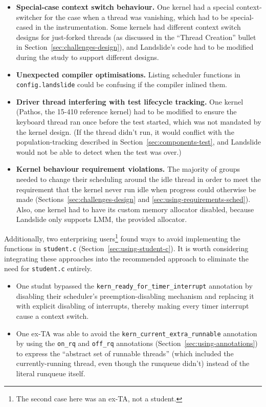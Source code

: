 \begin{itemize}
	\item {\bf Special-case context switch behaviour.} One kernel had a special context-switcher for the case when a thread was vanishing, which had to be special-cased in the instrumentation.
		Some kernels had different context switch designs for just-forked threads (as discussed in the ``Thread Creation'' bullet in Section~\ref{sec:challenges-design}), and Landslide's code had to be modified during the study to support different designs.
	\item {\bf Unexpected compiler optimisations.} Listing scheduler functions in \texttt{config.landslide} could be confusing if the compiler inlined them.
	\item {\bf Driver thread interfering with test lifecycle tracking.} One kernel (Pathos, the 15-410 reference kernel) had to be modified to ensure the keyboard thread ran once before the test started, which was not mandated by the kernel design. (If the thread didn't run, it would conflict with the population-tracking described in Section~\ref{sec:components-test}, and Landslide would not be able to detect when the test was over.)
	\item {\bf Kernel behaviour requirement violations.}
		The majority of groups needed to change their scheduling around the idle thread in order to meet the requirement that the kernel never run idle when progress could otherwise be made (Sections~\ref{sec:challenges-design} and \ref{sec:using-requirements-sched}).
		Also, one kernel had to have its custom memory allocator disabled, because Landslide only supports LMM, the provided allocator.
\end{itemize}

Additionally, two enterprising users\footnote{The second case here was an ex-TA, not a student.} found ways to avoid implementing the functions in \texttt{student.c} (Section~\ref{sec:using-student-c}). It is worth considering integrating these approaches into the recommended approach to eliminate the need for \texttt{student.c} entirely.
\begin{itemize}
	\item One studnt bypassed the \texttt{kern\_ready\_for\_timer\_interrupt} annotation by disabling their scheduler's preemption-disabling mechanism and replacing it with explicit disabling of interrupts, thereby making every timer interrupt cause a context switch.
	\item One ex-TA was able to avoid the \texttt{kern\_current\_extra\_runnable} annotation by using the \texttt{on\_rq} and \texttt{off\_rq} annotations (Section~\ref{sec:using-annotations}) to express the ``abstract set of runnable threads'' (which included the currently-running thread, even though the runqueue didn't) instead of the literal runqueue itself.
\end{itemize}

